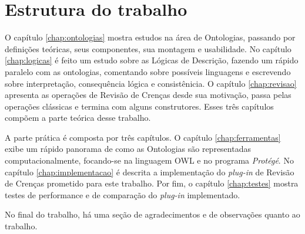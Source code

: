 \section{Estrutura do trabalho}

O capítulo \ref{chap:ontologias} mostra estudos na área de Ontologias, passando por definições teóricas, seus componentes, sua montagem e usabilidade. No capítulo \ref{chap:logicas} é feito um estudo sobre as Lógicas de Descrição, fazendo um rápido paralelo com as ontologias, comentando sobre possíveis linguagens e escrevendo sobre interpretação, consequência lógica e consistênicia. O capítulo \ref{chap:revisao} apresenta as operações de Revisão de Crenças desde sua motivação, passa pelas operações clássicas e termina com alguns construtores. Esses três capítulos compõem a parte teórica desse trabalho.

A parte prática é composta por três capítulos. O capítulo \ref{chap:ferramentas} exibe um rápido panorama de como as Ontologias são representadas computacionalmente, focando-se na linguagem OWL e no programa \textit{Protégé}. No capítulo \ref{chap:implementacao} é descrita a implementação do \textit{plug-in} de Revisão de Crenças prometido para este trabalho. Por fim, o capítulo \ref{chap:testes} mostra testes de performance e de comparação do \textit{plug-in} implementado.

No final do trabalho, há uma seção de agradecimentos e de observações quanto ao trabalho.